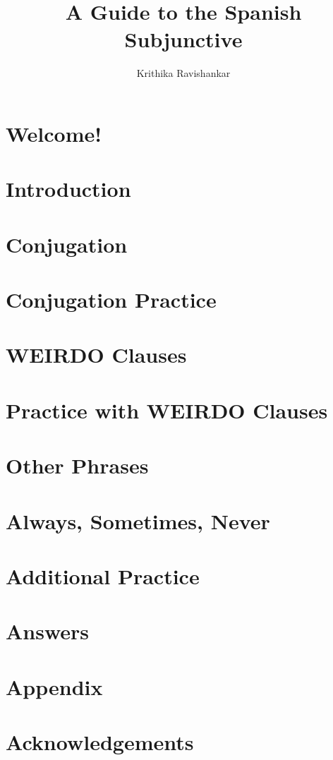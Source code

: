 \documentclass[12pt, oneside]{book}
\title{A Guide to the Spanish Subjunctive}
\author{Krithika Ravishankar}
\begin{document}
\sloppy
\maketitle
\clearpage
\thispagestyle{plain}
\par{}

\tableofcontents
\chapter{Welcome!}



\chapter{Introduction}

\chapter{Conjugation}

\chapter{Conjugation Practice}

\chapter{WEIRDO Clauses}

\chapter{Practice with WEIRDO Clauses}

\chapter{Other Phrases}

\chapter{Always, Sometimes, Never}

\chapter{Additional Practice}

\chapter{Answers}

\chapter{Appendix}
\label{sec:appendix}

\listoftables
\chapter{Acknowledgements}

\end{document}
